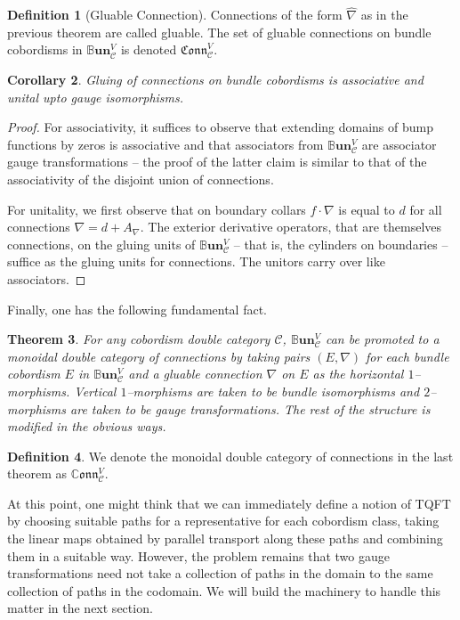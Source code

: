 \documentclass{amsart}
\newcommand{\s}{\mathscr}
\newcommand{\wh}{\widehat}
\newcommand{\BBun}{\mathbb{B}\textbf{un}}
\newcommand{\Conn}{\mathfrak{Conn}}
\newcommand{\CConn}{\mathbb{C}\mathfrak{onn}}
\newtheorem{thm}{Theorem}
\numberwithin{thm}{section}
\newtheorem{cor}[thm]{Corollary}
\theoremstyle{definition}
\newtheorem{defn}[thm]{Definition}
\begin{document}
\begin{defn}[Gluable Connection]
Connections of the form $\wh{\nabla}$ as in the previous theorem are called
gluable. The set of gluable connections on bundle cobordisms in
$\BBun^V_{\s{C}}$ is denoted $\Conn^V_{\s{C}}$.
\end{defn}

\begin{cor}
Gluing of connections on bundle cobordisms is associative and unital upto gauge
isomorphisms.
\end{cor}
\begin{proof}
For associativity, it suffices to observe that extending domains of bump
functions by zeros is associative and that associators from $\BBun^V_{\s{C}}$
are associator gauge transformations -- the proof of the latter claim is similar
to that of the associativity of the disjoint union of connections.

For unitality, we first observe that on boundary collars $f \cdot \nabla$ is
equal to $d$ for all connections $\nabla = d + A_{\nabla}$. The exterior
derivative operators, that are themselves connections, on the gluing
units of $\BBun^V_{\s{C}}$ -- that is, the cylinders on boundaries -- suffice
as the gluing units for connections. The unitors carry over like associators.
\end{proof}

Finally, one has the following fundamental fact.

\begin{thm}
For any cobordism double category $\s{C}$, $\BBun^V_{\s{C}}$ can be promoted to
a monoidal double category of connections by taking pairs $(E, \nabla)$ for each
bundle cobordism $E$ in $\BBun^V_{\s{C}}$ and a gluable connection $\nabla$ on
$E$ as the horizontal $1$--morphisms. Vertical $1$--morphisms are taken to be
bundle isomorphisms and $2$--morphisms are taken to be gauge transformations.
The rest of the structure is modified in the obvious ways.
\end{thm}

\begin{defn}
We denote the monoidal double category of connections in the last theorem as
$\CConn^V_{\s{C}}$.
\end{defn}

At this point, one might think that we can immediately define a notion of TQFT
by choosing suitable paths for a representative for each cobordism class,
taking the linear maps obtained by parallel transport along these paths and
combining them in a suitable way. However, the problem remains that two gauge
transformations need not take a collection of paths in the domain to the same
collection of paths in the codomain. We will build the machinery to handle this
matter in the next section.
\end{document}
